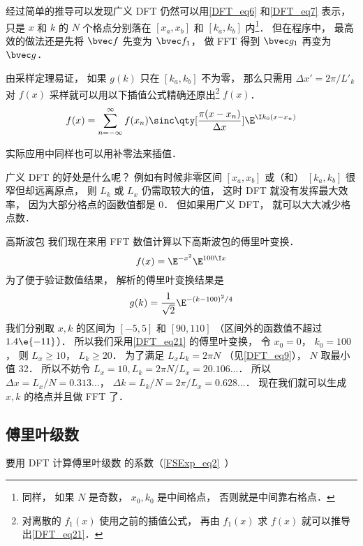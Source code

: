 经过简单的推导可以发现广义 DFT 仍然可以用\autoref{DFT_eq6} 和\autoref{DFT_eq7} 表示， 只是 $x$ 和 $k$ 的 $N$ 个格点分别落在 $[x_a, x_b]$ 和 $[k_a, k_b]$ 内\footnote{同样， 如果 $N$ 是奇数， $x_0, k_0$ 是中间格点， 否则就是中间靠右格点．}． 但在程序中， 最高效的做法还是先将 $\bvec f$ 先变为 $\bvec f_1$， 做 FFT 得到 $\bvec g_1$ 再变为 $\bvec g$．

由采样定理易证， 如果 $g(k)$ 只在 $[k_a, k_b]$ 不为零， 那么只需用 $\Delta x' = 2\pi/L'_k$ 对 $f(x)$ 采样就可以用以下插值公式精确还原出\footnote{对离散的 $f_1(x)$ 使用之前的插值公式， 再由 $f_1(x)$ 求 $f(x)$ 就可以推导出\autoref{DFT_eq21}．} $f(x)$．
\begin{equation}\label{DFT_eq21}
f(x) = \sum_{n = -\infty}^{\infty} f(x_n)\sinc\qty[\frac{\pi(x - x_n)}{\Delta x}] \E^{\I k_0 (x-x_n)}
\end{equation}

实际应用中同样也可以用补零法来插值．

广义 DFT 的好处是什么呢？ 例如有时候非零区间 $[x_a, x_b]$ 或（和） $[k_a, k_b]$ 很窄但却远离原点， 则 $L_k$ 或 $L_x$ 仍需取较大的值， 这时 DFT 就没有发挥最大效率， 因为大部分格点的函数值都是 0． 但如果用广义 DFT， 就可以大大减少格点数．

\begin{example}{高斯波包}
我们现在来用 FFT 数值计算以下高斯波包的傅里叶变换．
\begin{equation}
f(x) = \E^{-x^2}\E^{100 \I x}
\end{equation}
为了便于验证数值结果， 解析的傅里叶变换结果是%
\begin{equation}
g(k) = \frac{1}{\sqrt2}\E^{-(k-100)^2/4}
\end{equation}
我们分别取 $x, k$ 的区间为 $[-5, 5]$ 和 $[90, 110]$ （区间外的函数值不超过 $1.4\e{-11}$）． 所以我们采用\autoref{DFT_eq21} 的傅里叶变换， 令 $x_0 = 0$， $k_0 = 100$， 则 $L_x \geqslant 10$， $L_k \geqslant 20$． 为了满足 $L_x L_k = 2\pi N$ （见\autoref{DFT_eq9}）， $N$ 取最小值 32． 所以不妨令 $L_x = 10, L_k = 2\pi N/L_x = 20.106...$．
所以 $\Delta x = L_x/N = 0.313...$， $\Delta k = L_k/N = 2\pi/L_x = 0.628...$． 现在我们就可以生成 $x, k$ 的格点并且做 FFT 了．
\end{example}

\subsection{傅里叶级数}
要用 DFT 计算傅里叶级数 的系数（\autoref{FSExp_eq2}~）
